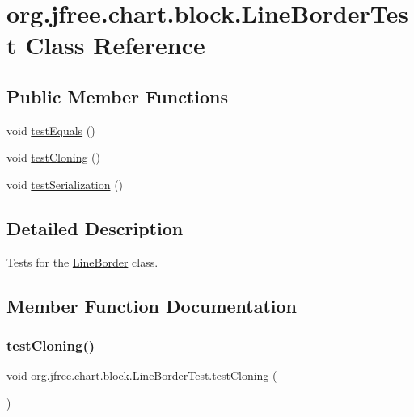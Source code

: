 \hypertarget{classorg_1_1jfree_1_1chart_1_1block_1_1_line_border_test}{}\section{org.\+jfree.\+chart.\+block.\+Line\+Border\+Test Class Reference}
\label{classorg_1_1jfree_1_1chart_1_1block_1_1_line_border_test}
\subsection*{Public Member Functions}
\begin{DoxyCompactItemize}
\item 
void \mbox{\hyperlink{classorg_1_1jfree_1_1chart_1_1block_1_1_line_border_test_a03be718d18d07851d1aea20ecbe63ede}{test\+Equals}} ()
\item 
void \mbox{\hyperlink{classorg_1_1jfree_1_1chart_1_1block_1_1_line_border_test_aea6f7ee12a4859fd980798420b74d7cc}{test\+Cloning}} ()
\item 
void \mbox{\hyperlink{classorg_1_1jfree_1_1chart_1_1block_1_1_line_border_test_af384c49509551b1488567159d5caf7fe}{test\+Serialization}} ()
\end{DoxyCompactItemize}


\subsection{Detailed Description}
Tests for the \mbox{\hyperlink{classorg_1_1jfree_1_1chart_1_1block_1_1_line_border}{Line\+Border}} class. 

\subsection{Member Function Documentation}
\mbox{\label{classorg_1_1jfree_1_1chart_1_1block_1_1_line_border_test_aea6f7ee12a4859fd980798420b74d7cc}} 
\subsubsection{\texorpdfstring{test\+Cloning()}{testCloning()}}
{\footnotesize\ttfamily void org.\+jfree.\+chart.\+block.\+Line\+Border\+Test.\+test\+Cloning (\begin{DoxyParamCaption}{ }\end{DoxyParamCaption})}

